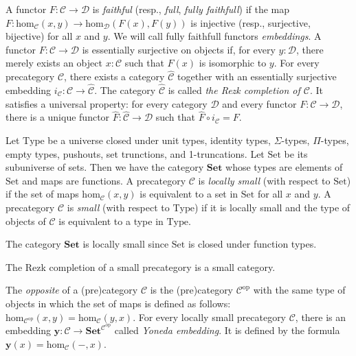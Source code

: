 \documentclass[reqno]{amsart}
\theoremstyle{definition}
\theoremstyle{remark}
\newcommand{\fs}[1]{\mathrm{#1}}
\newcommand{\cat}[1]{\mathbf{#1}}
\newcommand{\scat}[1]{\mathcal{#1}}
\renewcommand{\hom}{\fs{hom}}
\newcommand{\Set}{\cat{Set}}
\newcommand{\uSet}{\fs{Set}}
\newcommand{\uType}{\fs{Type}}
\numberwithin{figure}{section}
\begin{document}
A functor $F : \scat{C} \to \scat{D}$ is \emph{faithful} (resp., \emph{full}, \emph{fully faithfull}) if the map $F : \hom_\scat{C}(x,y) \to \hom_\scat{D}(F(x),F(y))$ is injective (resp., surjective, bijective) for all $x$ and $y$.
We will call fully faithfull functors \emph{embeddings}.
A functor $F : \scat{C} \to \scat{D}$ is essentially surjective on objects if, for every $y : \scat{D}$, there merely exists an object $x : \scat{C}$ such that $F(x)$ is isomorphic to $y$.
For every precategory $\scat{C}$, there exists a category $\widehat{\scat{C}}$ together with an essentially surjective embedding $i_\scat{C} : \scat{C} \to \widehat{\scat{C}}$.
The category $\widehat{\scat{C}}$ is called \emph{the Rezk completion of $\scat{C}$}.
It satisfies a universal property: for every category $\scat{D}$ and every functor $F : \scat{C} \to \scat{D}$, there is a unique functor $\widehat{F} : \widehat{\scat{C}} \to \scat{D}$ such that $\widehat{F} \circ i_\scat{C} = F$.

Let $\uType$ be a universe closed under unit types, identity types, $\Sigma$-types, $\Pi$-types, empty types, pushouts, set trunctions, and 1-truncations.
Let $\uSet$ be its subuniverse of sets.
Then we have the category $\Set$ whose types are elements of $\uSet$ and maps are functions.
A precategory $\scat{C}$ is \emph{locally small} (with respect to $\uSet$) if the set of maps $\hom_\scat{C}(x,y)$ is equivalent to a set in $\uSet$ for all $x$ and $y$.
A precategory $\scat{C}$ is \emph{small} (with respect to $\uType$) if it is locally small and the type of objects of $\scat{C}$ is equivalent to a type in $\uType$.

\begin{example}
The category $\Set$ is locally small since $\uSet$ is closed under function types.
\end{example}

\begin{example}
The Rezk completion of a small precategory is a small category.
\end{example}

The \emph{opposite} of a (pre)category $\scat{C}$ is the (pre)category $\scat{C}^\fs{op}$ with the same type of objects in which the set of maps is defined as follows: $\hom_{\scat{C}^\fs{op}}(x,y) = \hom_\scat{C}(y,x)$.
For every locally small precategory $\scat{C}$, there is an embedding $\cat{y} : \scat{C} \to \Set^{\scat{C}^\fs{op}}$ called \emph{Yoneda embedding}.
It is defined by the formula $\cat{y}(x) = \hom_\scat{C}(-,x)$.
\end{document}
